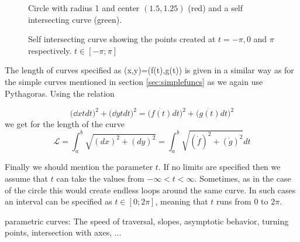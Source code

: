 \begin{figure}

  \caption{\small Circle with radius 1 and center $(1.5,1.25)$ (red) and a self intersecting curve (green).}
  \label{fig-circle2d}
\end{figure}


\begin{figure}
\caption{\small Self intersecting curve showing the points created at $t=-\pi,0$ and $\pi$ respectively. 
$t \in [-\pi;\pi]$}
\label{fig-intersect}
\end{figure}



The length of curves specified as (x,y)=(f(t),g(t)) is given in a similar way as for the simple 
curves mentioned in section \ref{sec:simplefuncs} as we again use Pythagoras. Using the relation

$$
   \Big(\dd{x}{t}dt\Big)^2 + \Big(\dd{y}{t}dt\Big)^2 = \Big(\dot{f(t)}dt\Big)^2 +  \Big(\dot{g(t)}dt\Big)^2
$$
we get for the length of the curve 
\begin{equation} \label{eq:length}
  \mathcal{L} = \int_a^b\sqrt{(dx)^2 + (dy)^2} = 
  \int_a^b\sqrt{(\dot{f})^2 + (\dot{g})^2}dt
\end{equation}

Finally we should mention the parameter $t$. If no limits are specified then we assume that $t$ can take 
the values from $-\infty < t < \infty$. Sometimes, as in the case of the circle this would create 
endless loops around the same curve. In such cases an interval can be specified as $t \in [0;2\pi]$,
meaning that $t$ runs from $0$ to $2\pi$.

 parametric curves: The speed of traversal,
slopes, asymptotic behavior, turning points, intersection with axes, ...




